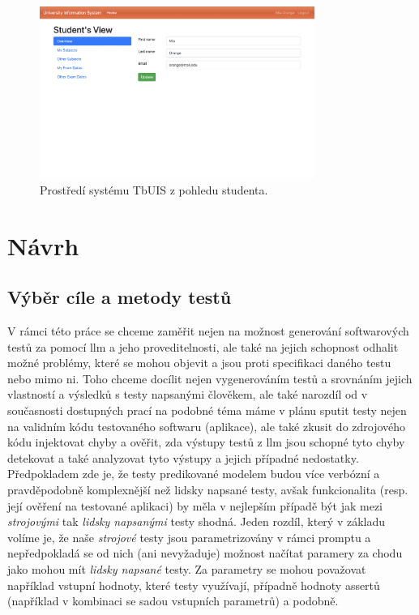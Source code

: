 \documentclass[czech, ma, kiv, he, iso690numb, pdf, viewonly]{fasthesis}
\begin{document}
    \begin{figure}
        \includegraphics[width=0.8\textwidth]{pic/tbuis.png}
        \centering
        \caption{Prostředí systému TbUIS z pohledu studenta.}
        \label{fig:tbuis}
    \end{figure}

\chapter{Návrh}

        \section{Výběr cíle a metody testů} \label{sec:goals}
        V rámci této práce se chceme zaměřit nejen na možnost generování softwarových testů za pomocí \Gls{llm} a jeho proveditelnosti, ale také na jejich schopnost odhalit možné problémy, které se mohou objevit a jsou proti specifikaci daného testu nebo mimo ni. Toho chceme docílit nejen vygenerováním testů a srovnáním jejich vlastností a výsledků s testy napsanými člověkem, ale také narozdíl od v současnosti dostupných prací na podobné téma máme v plánu sputit testy nejen na validním kódu testovaného softwaru (aplikace), ale také zkusit do zdrojového kódu injektovat chyby a ověřit, zda výstupy testů z \Gls{llm} jsou schopné tyto chyby detekovat a také analyzovat tyto výstupy a jejich případné nedostatky. Předpokladem zde je, že testy predikované modelem budou více verbózní a pravděpodobně komplexnější než lidsky napsané testy, avšak funkcionalita (resp. její ověření na testované aplikaci) by měla v nejlepším případě být jak mezi \textit{strojovými} tak \textit{lidsky napsanými} testy shodná. Jeden rozdíl, který v základu volíme je, že naše \textit{strojové} testy jsou parametrizovány v rámci promptu a nepředpokladá se od nich (ani nevyžaduje) možnost načítat paramery za chodu jako mohou mít \textit{lidsky napsané} testy. Za parametry se mohou považovat například vstupní hodnoty, které testy využívají, případně hodnoty assertů (například v kombinaci se sadou vstupních parametrů) a podobně.
\end{document}
